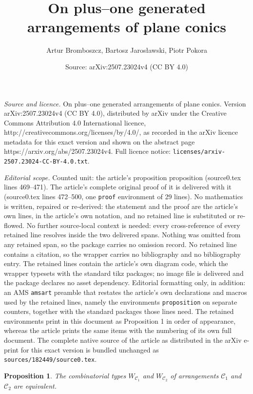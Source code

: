 \documentclass[10pt,a4paper]{amsart}
\title{On plus--one generated arrangements of plane conics}
\author{Artur Bromboszcz, Bartosz Jaros\l awski, Piotr Pokora}
\date{Source: arXiv:2507.23024v4 (CC BY 4.0)}
\newtheorem{proposition}{Proposition}
\begin{document}
\maketitle

\noindent\emph{Source and licence.} On plus--one generated arrangements of plane conics. Version arXiv:2507.23024v4 (CC BY 4.0), distributed by arXiv under the Creative Commons Attribution 4.0 International licence, http://creativecommons.org/licenses/by/4.0/, as recorded in the arXiv licence metadata for this exact version and shown on the abstract page https://arxiv.org/abs/2507.23024v4. Full licence notice: \texttt{licenses/arxiv-2507.23024-CC-BY-4.0.txt}.\par\smallskip

\noindent\textit{Editorial scope.} Counted unit: the article's proposition proposition (source0.tex lines 469--471). The article's complete original proof of it is delivered with it (source0.tex lines 472--500, one \texttt{proof} environment of 29 lines). No mathematics is written, repaired or re-derived: the statement and the proof are the article's own lines, in the article's own notation, and no retained line is substituted or re-flowed.  No further source-local context is needed: every cross-reference of every retained line resolves inside the two delivered spans.  Nothing was omitted from any retained span, so the package carries no omission record.  No retained line contains a citation, so the wrapper carries no bibliography and no bibliography entry.  The retained lines contain the article's own diagram code, which the wrapper typesets with the standard tikz packages; no image file is delivered and the package declares no asset dependency.  Editorial formatting only, in addition: an AMS \texttt{amsart} preamble that restates the article's own declarations and macros used by the retained lines, namely the environments \texttt{proposition} on separate counters, together with the standard packages those lines need.  The retained environments print in this document as Proposition 1 in order of appearance, whereas the article prints the same items with the numbering of its own full document.  The complete native source of the article as distributed in the arXiv e-print for this exact version is bundled unchanged as \texttt{sources/182449/source0.tex}.
\begin{proposition}
The combinatorial types $W_{\mathcal{C}_{1}}$ and $W_{\mathcal{C}_{2}}$ of arrangements $\mathcal{C}_{1}$ and $\mathcal{C}_{2}$ are equivalent.
\end{proposition}
\end{document}
